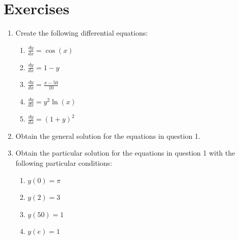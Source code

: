 \section{Exercises}
\label{\detokenize{tools-for-mathematics/09-differential-equations/exercises/main:exercises}}\label{\detokenize{tools-for-mathematics/09-differential-equations/exercises/main::doc}}
\begin{enumerate}

\item 

Create the following differential equations:
\begin{enumerate}

\item 

\(\frac{dy}{dx} = \cos(x)\)

\item 

\(\frac{dy}{dx} = 1 - y\)

\item 

\(\frac{dy}{dx} = \frac{x - 50}{10}\)

\item 

\(\frac{dy}{dx} = y ^2 \ln (x)\)

\item 

\(\frac{dy}{dx} = (1 + y) ^ 2\)

\end{enumerate}

\item 

Obtain the general solution for the equations in question 1.

\item 

Obtain the particular solution for the equations in question 1 with
the following particular conditions:
\begin{enumerate}

\item 

\(y(0) = \pi\)

\item 

\(y(2) = 3\)

\item 

\(y(50) = 1\)

\item 

\(y(e) = 1\)


\end{enumerate}
\end{enumerate}
